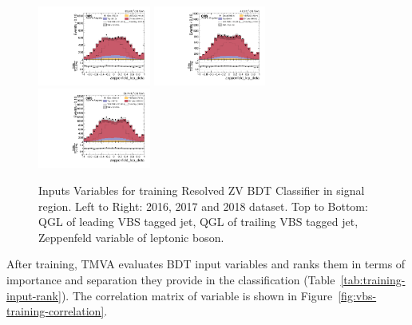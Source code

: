 \begin{figure}[!ht]
  \includegraphics[width=0.33\textwidth]{analysis_plots/2016_zjj/sr_l/zeppenfeld_lep_deta.pdf} \hspace{-10pt}
  \includegraphics[width=0.33\textwidth]{analysis_plots/2017_zjj/sr_l/zeppenfeld_lep_deta.pdf} \hspace{-10pt}
  \includegraphics[width=0.33\textwidth]{analysis_plots/2018_zjj/sr_l/zeppenfeld_lep_deta.pdf} \hspace{-10pt}
  \caption[Inputs Variables for training Resolved ZV BDT Classifier in signal region.]%
  {Inputs Variables for training Resolved ZV BDT Classifier in signal region.
    Left to Right: 2016, 2017 and 2018 dataset.
    Top to Bottom: QGL of leading VBS tagged jet,
    QGL of trailing VBS tagged jet, Zeppenfeld variable of leptonic boson.}%
  \label{fig:vbs-training-input-zjj-1-sr}
\end{figure}

\clearpage{}

After training, \gls{TMVA} evaluates \gls{BDT} input variables
and ranks them in terms of importance and separation
they provide in the classification (Table~\ref{tab:training-input-rank}).
The correlation matrix of variable is shown in Figure~\ref{fig:vbs-training-correlation}.

